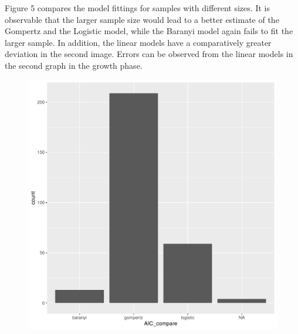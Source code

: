 \documentclass[11pt, oneside]{article}
\begin{document}
		\noindent Figure 5 compares the model fittings for samples with different sizes. It is observable that the larger sample size would lead to a better estimate of the Gompertz and the Logistic model, while the Baranyi model again fails to fit the larger sample. In addition, the linear models have a comparatively greater deviation in the second image. Errors can be observed from the linear models in the second graph in the growth phase.
		
		\begin{figure}[H]
			\begin{center}
			\begin{minipage}{.5\textwidth}
				\centering
				\includegraphics[scale = 0.4]{AIC_plot.pdf}
			\end{minipage}%
			\begin{minipage}{.5\textwidth}
				\centering

\end{minipage}
\end{center}
\end{figure}
\end{document}
